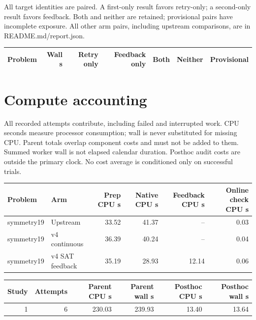\documentclass[10pt,a4paper]{article}
\begin{document}
All target identities are paired. A first-only result favors retry-only; a second-only result favors feedback. Both and neither are retained; provisional pairs have incomplete exposure. All other arm pairs, including upstream comparisons, are in README.md/report.json.

\begin{center}\small\begin{longtable}{lrrrrrr}
\toprule
Problem & Wall s & Retry only & Feedback only & Both & Neither & Provisional \\
\midrule\endhead

\bottomrule\end{longtable}\end{center}


\section*{Compute accounting}

All recorded attempts contribute, including failed and interrupted work. CPU seconds measure processor consumption; wall is never substituted for missing CPU. Parent totals overlap component costs and must not be added to them. Summed worker wall is not elapsed calendar duration. Posthoc audit costs are outside the primary clock. No cost average is conditioned only on successful trials.

\begin{center}\small\begin{longtable}{llrrrr}
\toprule
Problem & Arm & Prep CPU s & Native CPU s & Feedback CPU s & Online check CPU s \\
\midrule\endhead
symmetry19 & Upstream & 33.52 & 41.37 & -- & 0.03 \\
symmetry19 & v4 continuous & 36.39 & 40.24 & -- & 0.04 \\
symmetry19 & v4 SAT feedback & 35.19 & 28.93 & 12.14 & 0.06 \\
\bottomrule\end{longtable}\end{center}


\begin{center}\small\begin{longtable}{rrrrrr}
\toprule
Study & Attempts & Parent CPU s & Parent wall s & Posthoc CPU s & Posthoc wall s \\
\midrule\endhead
1 & 6 & 230.03 & 239.93 & 13.40 & 13.64 \\
\bottomrule\end{longtable}\end{center}
\end{document}
